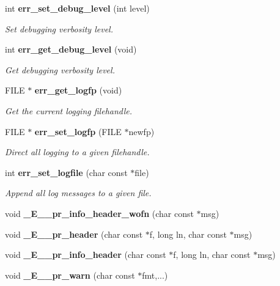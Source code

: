 \begin{DoxyCompactItemize}
\item 
int {\bf err\-\_\-set\-\_\-debug\-\_\-level} (int level)
\begin{DoxyCompactList}\small\item\em \-Set debugging verbosity level. \end{DoxyCompactList}\item 
int {\bf err\-\_\-get\-\_\-debug\-\_\-level} (void)
\begin{DoxyCompactList}\small\item\em \-Get debugging verbosity level. \end{DoxyCompactList}\item 
\-F\-I\-L\-E $\ast$ {\bf err\-\_\-get\-\_\-logfp} (void)
\begin{DoxyCompactList}\small\item\em \-Get the current logging filehandle. \end{DoxyCompactList}\item 
\-F\-I\-L\-E $\ast$ {\bf err\-\_\-set\-\_\-logfp} (\-F\-I\-L\-E $\ast$newfp)
\begin{DoxyCompactList}\small\item\em \-Direct all logging to a given filehandle. \end{DoxyCompactList}\item 
int {\bf err\-\_\-set\-\_\-logfile} (char const $\ast$file)
\begin{DoxyCompactList}\small\item\em \-Append all log messages to a given file. \end{DoxyCompactList}\item 
void {\bfseries \-\_\-\-E\-\_\-\-\_\-pr\-\_\-info\-\_\-header\-\_\-wofn} (char const $\ast$msg)\label{err_8c_afd2e78db5fc2b29d87b434d0a2d0d07e}

\item 
void {\bfseries \-\_\-\-E\-\_\-\-\_\-pr\-\_\-header} (char const $\ast$f, long ln, char const $\ast$msg)\label{err_8c_a5ff468fc371d3fd651257df3819e412a}

\item 
void {\bfseries \-\_\-\-E\-\_\-\-\_\-pr\-\_\-info\-\_\-header} (char const $\ast$f, long ln, char const $\ast$msg)\label{err_8c_af0a195f2b0f1f9fc2ef7d60593b66faa}

\item 
void {\bfseries \-\_\-\-E\-\_\-\-\_\-pr\-\_\-warn} (char const $\ast$fmt,...)\label{err_8c_a8cdfd1775cf364e5705bb00a262c7865}


\end{DoxyCompactItemize}
